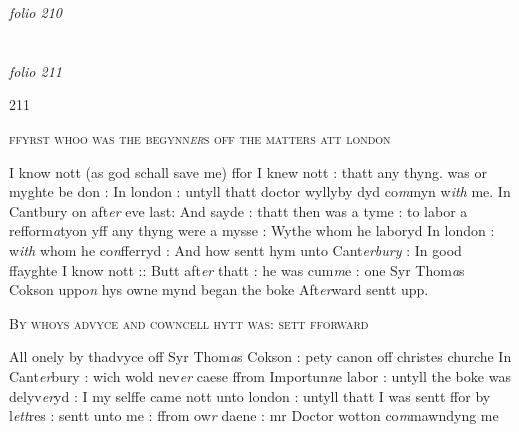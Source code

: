 \documentclass[12pt, a4paper]{book}
\begin{document}
\dotfill
						\newpage
{}

\textit{folio 210}


         \vspace*{4cm}
         
\dotfill
						  \section*{}  \subsection*{}

\textit{folio 211}



\begin{flushright}{\color{Mahogany}211}\end{flushright}

				\begin{center} \begin{large} {\scshape ffyrst whoo was the begynn\textit{er}s off
the matters att london} \end{large} \end{center}
			

	
		\ifthenelse{\isodd{\thepage}}
		{\reversemarginpar}
		{\normalmarginpar}
		I know nott (as god schall save me) ffor I knew nott : thatt any
		thyng. was or myghte be don : In london : untyll thatt doctor
wyllyby dyd co\textit{m}myn w\textit{ith} me. In Cantbury on aft\textit{er} eve last:
And sayde : thatt then was a tyme : to labor a refform\textit{a}tyon
yff any thyng were a mysse : Wythe whom he laboryd In
london : w\textit{ith} whom he co\textit{n}fferryd : And how sentt hym unto
Cant\textit{erbury} : In good ffayghte I know nott :: Butt aft\textit{er} thatt : he
		was cum\textit{m}e : one Syr Thom\textit{a}s Cokson uppo\textit{n} hys owne mynd
began the boke Aft\textit{er}ward sentt upp.


	
				\begin{center}  {\scshape By whoys advyce and cowncell
hytt was: sett fforward}  \end{center}
			

	
		\ifthenelse{\isodd{\thepage}}
		{\reversemarginpar}
		{\normalmarginpar}
		All onely by thadvyce off Syr Thom\textit{a}s Cokson : pety canon off
christes churche In Cant\textit{er}bury : wich wold nev\textit{er} caese ffrom Importun\textit{n}e
labor : untyll the boke was delyv\textit{er}yd : I my selffe came nott
unto london : untyll thatt I was sentt ffor by l\textit{ett}res : sentt
		unto me : ffrom ow\textit{r} daene : mr Doctor wotton co\textit{m}mawndyng me
			
\end{document}
